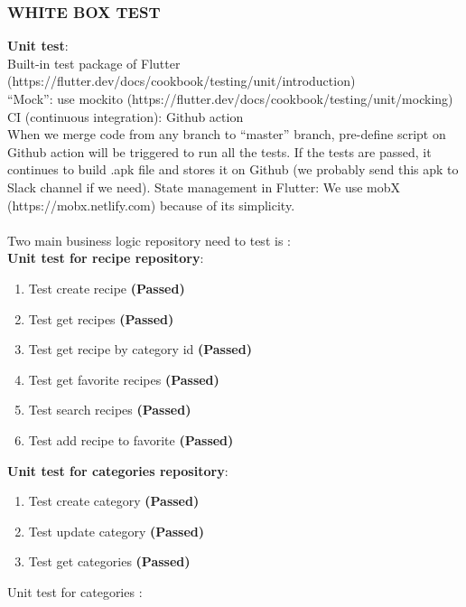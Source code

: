 \documentclass{article}
\begin{document}
\subsubsection{WHITE BOX TEST} 
\textbf{Unit test}: \\
        Built-in test package of Flutter (https://flutter.dev/docs/cookbook/testing/unit/introduction) \\
        “Mock”: use mockito (https://flutter.dev/docs/cookbook/testing/unit/mocking) \\
        CI (continuous integration): Github action \\
        When we merge code from any branch to “master” branch, pre-define script on Github action will be triggered to run all the tests. If the tests are passed, it continues to build .apk file and stores it on Github (we probably send this apk to Slack channel if we need).
        State management in Flutter: We use mobX (https://mobx.netlify.com) because of its simplicity.\\ \\
    Two main business logic repository need to test is :  \\
    \textbf{Unit test for recipe repository}: 
    \begin{enumerate}
        \item Test create recipe \textbf{(Passed)}
        \item Test get recipes \textbf{(Passed)}
        \item Test get recipe by category id \textbf{(Passed)}
        \item Test get favorite recipes \textbf{(Passed)}
        \item Test search recipes \textbf{(Passed)}
        \item Test add recipe to favorite \textbf{(Passed)}
    \end{enumerate} 
    \newline
\textbf{Unit test for categories repository}: 
      \begin{enumerate}
        \item Test create category \textbf{(Passed)}
        \item Test update category \textbf{(Passed)}
        \item Test get categories \textbf{(Passed)}
    \end{enumerate} 
    \newpage
    Unit test for categories : 
\end{document}
